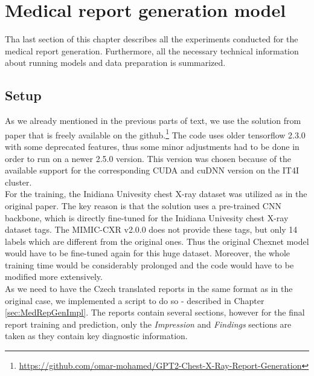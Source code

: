 \section{Medical report generation model}
Tha last section of this chapter describes all the experiments conducted for the medical report generation. Furthermore, all the necessary technical information about running models and data preparation is summarized.

\subsection{Setup}
As we already mentioned in the previous parts of text, we use the solution from \citet{alfarghaly2021automated} paper that is freely available on the github.\footnote[8]{\url{https://github.com/omar-mohamed/GPT2-Chest-X-Ray-Report-Generation}} The code uses older tensorflow 2.3.0 with some deprecated features, thus some minor adjustments had to be done in order to run on a newer 2.5.0 version. This version was chosen because of the available support for the corresponding CUDA and cuDNN version on the IT4I cluster. \\

For the training, the Inidiana Univesity chest X-ray dataset was utilized as in the original paper. The key reason is that the solution uses a pre-trained CNN backbone, which is directly fine-tuned for the Inidiana Univesity chest X-ray dataset tags. The MIMIC-CXR v2.0.0 does not provide these tags, but only 14 labels which are different from the original ones. Thus the original Chexnet model would have to be fine-tuned again for this huge dataset. Moreover, the whole training time would be considerably prolonged and the code would have to be modified more extensively.\\
 
As we need to have the Czech translated reports in the same format as in the original case, we implemented a script to do so - described in Chapter \ref{sec:MedRepGenImpl}. The reports contain several sections, however for the final report training and prediction, only the \textit{Impression} and \textit{Findings} sections are taken as they contain key diagnostic information. 

